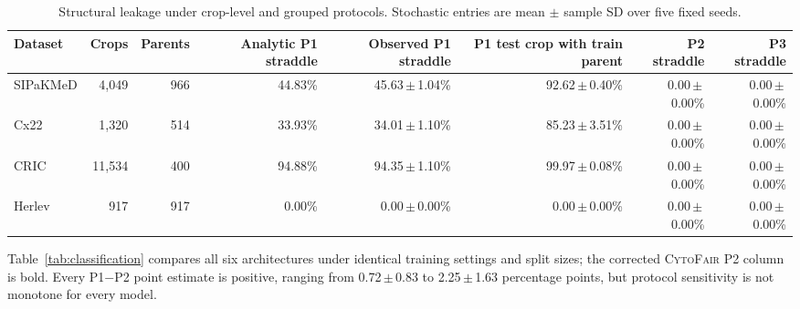 \documentclass[conference]{IEEEtran}
\newcommand{\meanpm}[2]{#1\,$\pm$\,#2}
\newcommand{\protocol}[1]{\textsf{#1}}
\newcommand{\cytofair}{\textsc{CytoFair}}
\begin{document}
\begin{table}[t]
\caption{Structural leakage under crop-level and grouped protocols. Stochastic entries are mean $\pm$ sample SD over five fixed seeds.}
\label{tab:structural}
\centering
\scriptsize
\setlength{\tabcolsep}{5.2pt}
\begin{tabular}{lrrrrrrr}
\toprule
Dataset & Crops & Parents & Analytic \protocol{P1} straddle & Observed \protocol{P1} straddle & \protocol{P1} test crop with train parent & \protocol{P2} straddle & \protocol{P3} straddle \\
\midrule
SIPaKMeD & 4,049 & 966 & 44.83\% & \meanpm{45.63}{1.04}\% & \meanpm{92.62}{0.40}\% & \meanpm{0.00}{0.00}\% & \meanpm{0.00}{0.00}\% \\
Cx22 & 1,320 & 514 & 33.93\% & \meanpm{34.01}{1.10}\% & \meanpm{85.23}{3.51}\% & \meanpm{0.00}{0.00}\% & \meanpm{0.00}{0.00}\% \\
CRIC & 11,534 & 400 & 94.88\% & \meanpm{94.35}{1.10}\% & \meanpm{99.97}{0.08}\% & \meanpm{0.00}{0.00}\% & \meanpm{0.00}{0.00}\% \\
Herlev & 917 & 917 & 0.00\% & \meanpm{0.00}{0.00}\% & \meanpm{0.00}{0.00}\% & \meanpm{0.00}{0.00}\% & \meanpm{0.00}{0.00}\% \\
\bottomrule
\end{tabular}
\end{table}

Table~\ref{tab:classification} compares all six architectures under identical training settings and split sizes; the corrected \cytofair{} \protocol{P2} column is bold.
Every \protocol{P1}$-$\protocol{P2} point estimate is positive, ranging from \meanpm{0.72}{0.83} to \meanpm{2.25}{1.63} percentage points, but protocol sensitivity is not monotone for every model.
\end{document}
